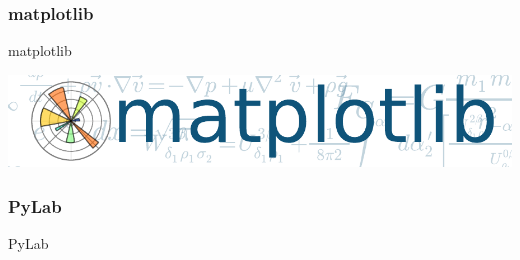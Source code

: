 \subsubsection{matplotlib}
\begin{frame}{matplotlib}
  \begin{center}
    \includegraphics[width=\textwidth]{../Notes/img/matplotlib.pdf}
  \end{center}
\end{frame}
\subsubsection{PyLab}
\begin{frame}{PyLab}
\end{frame}
